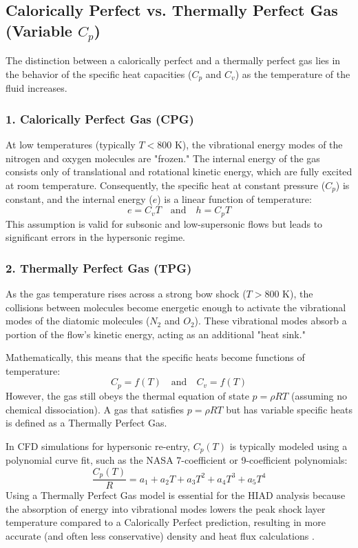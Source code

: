 \subsection{Calorically Perfect vs. Thermally Perfect Gas (Variable $C_p$)}

\par
The distinction between a calorically perfect and a thermally perfect gas lies in the behavior of the specific heat capacities ($C_p$ and $C_v$) as the temperature of the fluid increases.



\subsubsection*{1. Calorically Perfect Gas (CPG)}
At low temperatures (typically $T < 800$ K), the vibrational energy modes of the nitrogen and oxygen molecules are "frozen." The internal energy of the gas consists only of translational and rotational kinetic energy, which are fully excited at room temperature. Consequently, the specific heat at constant pressure ($C_p$) is constant, and the internal energy ($e$) is a linear function of temperature:
\begin{equation}
    e = C_v T \quad \text{and} \quad h = C_p T
\end{equation}
This assumption is valid for subsonic and low-supersonic flows but leads to significant errors in the hypersonic regime.
\par
\subsubsection*{2. Thermally Perfect Gas (TPG)}
As the gas temperature rises across a strong bow shock ($T > 800$ K), the collisions between molecules become energetic enough to activate the vibrational modes of the diatomic molecules ($N_2$ and $O_2$). These vibrational modes absorb a portion of the flow's kinetic energy, acting as an additional "heat sink."
\par
Mathematically, this means that the specific heats become functions of temperature:
\begin{equation}
    C_p = f(T) \quad \text{and} \quad C_v = f(T)
\end{equation}
However, the gas still obeys the thermal equation of state $p = \rho R T$ (assuming no chemical dissociation). A gas that satisfies $p=\rho R T$ but has variable specific heats is defined as a Thermally Perfect Gas.
\par
In CFD simulations for hypersonic re-entry, $C_p(T)$ is typically modeled using a polynomial curve fit, such as the NASA 7-coefficient or 9-coefficient polynomials:
\begin{equation}
    \frac{C_p(T)}{R} = a_1 + a_2 T + a_3 T^2 + a_4 T^3 + a_5 T^4
\end{equation}
Using a Thermally Perfect Gas model is essential for the HIAD analysis because the absorption of energy into vibrational modes lowers the peak shock layer temperature compared to a Calorically Perfect prediction, resulting in more accurate (and often less conservative) density and heat flux calculations \cite{AndersonHypersonic}.

